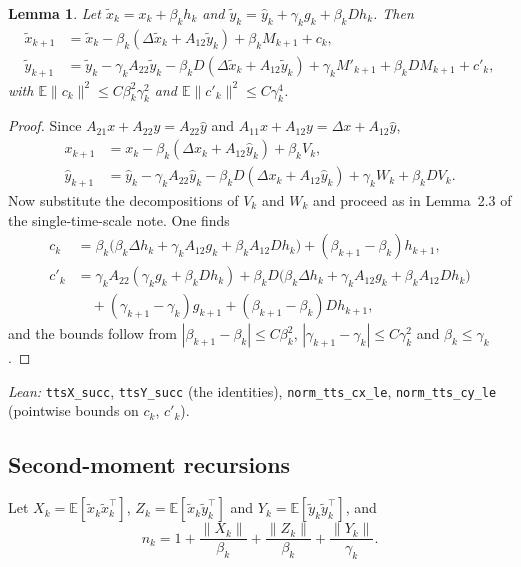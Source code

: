 \documentclass[11pt]{article}
\newtheorem{lemma}[theorem]{Lemma}
\theoremstyle{definition}
\theoremstyle{remark}
\newcommand{\E}{\mathbb{E}}
\begin{document}
\begin{lemma}\label{lem:cov}
Let $\tilde x_k = x_k + \beta_kh_k$ and $\tilde y_k = \hat y_k + \gamma_kg_k + \beta_kDh_k$. Then
\begin{align*}
  \tilde x_{k+1} &= \tilde x_k - \beta_k(\Delta\tilde x_k + A_{12}\tilde y_k) + \beta_kM_{k+1} + c_k,\\
  \tilde y_{k+1} &= \tilde y_k - \gamma_kA_{22}\tilde y_k - \beta_kD(\Delta\tilde x_k + A_{12}\tilde y_k)
    + \gamma_kM'_{k+1} + \beta_kDM_{k+1} + c'_k,
\end{align*}
with $\E\|c_k\|^2 \le C\beta_k^2\gamma_k^2$ and $\E\|c'_k\|^2 \le C\gamma_k^4$.
\end{lemma}
\begin{proof}
Since $A_{21}x + A_{22}y = A_{22}\hat y$ and $A_{11}x + A_{12}y = \Delta x + A_{12}\hat y$,
\begin{align*}
  x_{k+1} &= x_k - \beta_k(\Delta x_k + A_{12}\hat y_k) + \beta_kV_k,\\
  \hat y_{k+1} &= \hat y_k - \gamma_kA_{22}\hat y_k - \beta_kD(\Delta x_k + A_{12}\hat y_k) + \gamma_kW_k + \beta_kDV_k .
\end{align*}
Now substitute the decompositions of $V_k$ and $W_k$ and proceed as in Lemma~2.3 of the
single-time-scale note. One finds
\begin{align*}
  c_k &= \beta_k\big(\beta_k\Delta h_k + \gamma_kA_{12}g_k + \beta_kA_{12}Dh_k\big) + (\beta_{k+1} - \beta_k)h_{k+1},\\
  c'_k &= \gamma_kA_{22}(\gamma_kg_k + \beta_kDh_k) + \beta_kD\big(\beta_k\Delta h_k + \gamma_kA_{12}g_k + \beta_kA_{12}Dh_k\big)\\
    &\quad + (\gamma_{k+1} - \gamma_k)g_{k+1} + (\beta_{k+1} - \beta_k)Dh_{k+1},
\end{align*}
and the bounds follow from $|\beta_{k+1} - \beta_k| \le C\beta_k^2$, $|\gamma_{k+1} - \gamma_k| \le C\gamma_k^2$
and $\beta_k \le \gamma_k$.
\end{proof}
\noindent\emph{Lean:} \texttt{ttsX\_succ}, \texttt{ttsY\_succ} (the identities),
\texttt{norm\_tts\_cx\_le}, \texttt{norm\_tts\_cy\_le} (pointwise bounds on $c_k$, $c'_k$).

\subsection{Second-moment recursions}

Let $X_k = \E[\tilde x_k\tilde x_k^\top]$, $Z_k = \E[\tilde x_k\tilde y_k^\top]$ and
$Y_k = \E[\tilde y_k\tilde y_k^\top]$, and
\[
  n_k = 1 + \frac{\|X_k\|}{\beta_k} + \frac{\|Z_k\|}{\beta_k} + \frac{\|Y_k\|}{\gamma_k}.
\]
\end{document}

